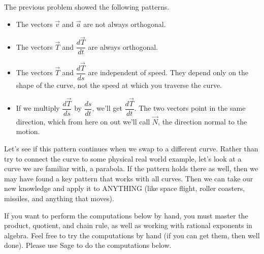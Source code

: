 \begin{observation}\label{curvature observations}
 The previous problem showed the following patterns.
\begin{itemize}
 \item The vectors $\vec v$ and $\vec a$ are not always orthogonal.
 \item The vectors $\vec T$ and $\dfrac{d\vec T}{dt}$ are always orthogonal.
 \item The vectors $\vec T$ and $\dfrac{d\vec T}{ds}$ are independent of speed. They depend only on the shape of the curve, not the speed at which you traverse the curve.
 \item If we multiply $\dfrac{d\vec T}{ds}$ by $\dfrac{ds}{dt}$, we'll get $\dfrac{d\vec T}{dt}$. The two vectors point in the same direction, which from here on out we'll call $\vec N$, the direction normal to the motion.
\end{itemize}
\end{observation}

Let's see if this pattern continues when we swap to a different curve. 
Rather than try to connect the curve to some physical real world example, let's look at a curve we are familiar with, a parabola. If the pattern holds there as well, then we may have found a key pattern that works with all curves.  Then we can take our new knowledge and apply it to ANYTHING (like space flight, roller coasters, missiles, and anything that moves).

If you want to perform the computations below by hand, you must master the product, quotient, and chain rule, as well as working with rational exponents in algebra. Feel free to try the computations by hand (if you can get them, then well done). Please use Sage to do the computations below.



